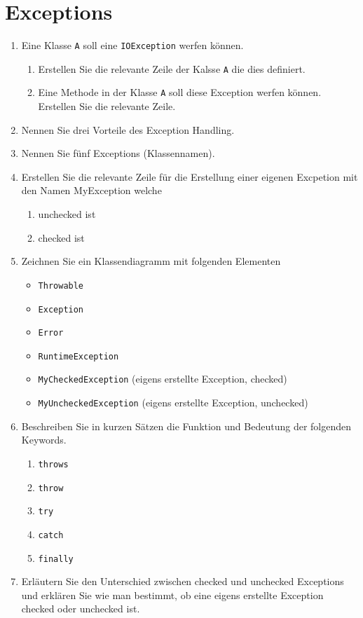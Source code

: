 \newpage
\section{Exceptions}

\begin{enumerate}
    \item Eine Klasse \verb?A? soll eine \verb?IOException? werfen können. 
        \begin{enumerate}[label=(\alph*)]
            \item Erstellen Sie die relevante Zeile der Kalsse \verb?A? die
                dies definiert.
            \item Eine Methode in der Klasse \verb?A? soll diese Exception
                werfen können. Erstellen Sie die relevante Zeile.
        \end{enumerate}
    \item Nennen Sie drei Vorteile des Exception Handling.
    \item Nennen Sie fünf Exceptions (Klassennamen).
    \item Erstellen Sie die relevante Zeile für die Erstellung einer eigenen
        Excpetion mit den Namen MyException welche
        \begin{enumerate}[label=(\alph*)]
            \item unchecked ist
            \item checked ist
        \end{enumerate}
    \item Zeichnen Sie ein Klassendiagramm mit folgenden Elementen
        \begin{itemize}
            \item \verb?Throwable?
            \item \verb?Exception?
            \item \verb?Error?
            \item \verb?RuntimeException?
            \item \verb?MyCheckedException? (eigens erstellte Exception, checked)
            \item \verb?MyUncheckedException? (eigens erstellte Exception, unchecked)
        \end{itemize}
    \item Beschreiben Sie in kurzen Sätzen die Funktion und Bedeutung
        der folgenden Keywords.
        \begin{enumerate}[label=(\alph*)]
            \item \verb?throws?
            \item \verb?throw?
            \item \verb?try?
            \item \verb?catch?
            \item \verb?finally?
        \end{enumerate}
    \item Erläutern Sie den Unterschied zwischen checked und unchecked 
        Exceptions und erklären Sie wie man bestimmt, ob eine eigens
        erstellte Exception checked oder unchecked ist.
\end{enumerate}
